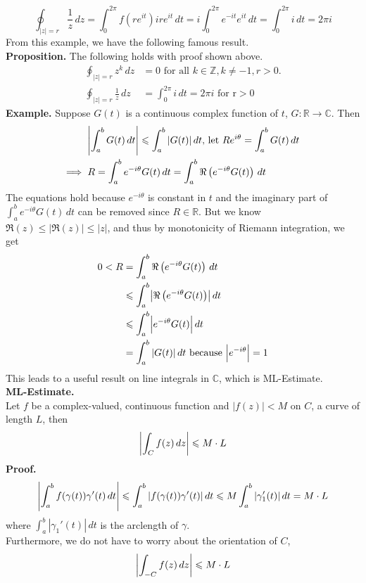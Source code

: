 \documentclass[11pt]{article}
\DeclarePairedDelimiter\abs{\lvert}{\rvert}
\begin{document}
$$\oint_{|z| = r} \frac{1}{z} \,dz = \int_0^{2\pi} f\left(re^{it}\right)ire^{it} \,dt = i\int_0^{2\pi}e^{-it}e^{it} \,dt = \int_0^{2\pi}i \,dt = 2\pi i$$
From this example, we have the following famous result. \\
\newline
\textbf{Proposition.} The following holds with proof shown above.
\begin{align*}
\oint_{|z| = r} z^k \,dz &= 0 \text{ for all } k \in \mathbb{Z}, k \neq -1, r > 0. \\
\oint_{|z| = r} \frac{1}{z} \,dz &= \int_0^{2\pi} i \,dt = 2\pi i \text{ for r} > 0 
\end{align*}
\newline
\textbf{Example.} Suppose $G(t)$ is a continuous complex function of $t$, $G: \mathbb{R} \to \mathbb{C}$. Then 
\begin{align*}
&\abs*{\int_a^bG(t)\,dt} \leqslant \int_a^b|G(t)|\,dt \text{, let } Re^{i\theta} = \int_a^b G(t) \,dt \\
\Longrightarrow \hspace{2mm}&R = \int_a^be^{-i\theta}G(t)\,dt = \int_a^b\Re\left(e^{-i\theta}G(t)\right)\,dt 
\end{align*}
The equations hold because $e^{-i\theta}$ is constant in $t$ and the imaginary part of $\int_a^be^{-i\theta}G(t) \, dt$ can be removed since $R \in \mathbb{R}$. 
But we know $\Re(z) \leqslant |\Re(z)| \leqslant |z|$, and thus by monotonicity of Riemann integration, we get 
\begin{align*}
0 < R &= \int_a^b\Re\left(e^{-i\theta}G(t)\right)\,dt \\
&\leqslant \int_a^b \abs*{\Re\left(e^{-i\theta}G(t)\right)} \,dt \\
&\leqslant \int_a^b \abs[\Big]{e^{-i\theta}G(t)} \,dt \\
&= \int_a^b|G(t)| \, dt \text{ because } \abs[\Big]{e^{-i\theta}} = 1 
\end{align*}
This leads to a useful result on line integrals in $\mathbb{C}$, which is ML-Estimate. \\
\newline
\textbf{ML-Estimate.} \\
Let $f$ be a complex-valued, continuous function and $|f(z)| < M$ on $C$, a curve of length $L$, then 
$$\abs*{\int_Cf(z) \,dz} \leqslant M \cdot L$$
\textbf{Proof.}
$$ \abs*{\int_a^b f(\gamma(t))\gamma'(t) \,dt} \leqslant \int_a^b|f(\gamma(t))\gamma'(t)| \,dt \leqslant M\int_a^b|\gamma_1'(t)| \,dt = M \cdot L$$
where $\int_a^b|\gamma_1'(t)| \,dt$ is the arclength of $\gamma$. \\
Furthermore, we do not have to worry about the orientation of $C$, 
$$ \abs*{\int_{-C}f(z) \,dz} \leqslant M \cdot L$$
\newpage
\end{document}
